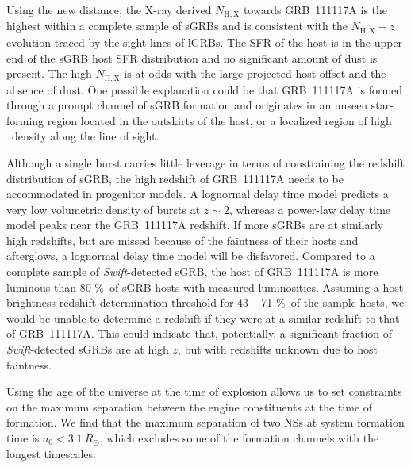 \documentclass[longauth]{aa}    %
\newcommand{\hi}{\ion{H}{i}}
\begin{document}
Using the new distance, the X-ray derived $N_\mathrm{H,X}$ towards GRB~111117A
is the highest within a complete sample of sGRBs and is consistent with the
$N_\mathrm{H,X}-z$ evolution traced by the sight lines of lGRBs. The SFR of the
host is in the upper end of the sGRB host SFR distribution and no significant
amount of dust is present. The high $N_\mathrm{H,X}$ is at odds with the large
projected host offset and the absence of dust. One possible explanation could be
that GRB~111117A is formed through a prompt channel of sGRB formation and
originates in an unseen star-forming region located in the outskirts of the
host, or a localized region of high \hi~density along the line of sight.

Although a single burst carries little leverage in terms of constraining the
redshift distribution of sGRB, the high redshift of GRB~111117A needs to be
accommodated in progenitor models. A lognormal delay time model predicts a very
low volumetric density of bursts at $z \sim 2$, whereas a power-law delay time
model peaks near the GRB~111117A redshift. If more sGRBs are at similarly high
redshifts, but are missed because of the faintness of their hosts and afterglows, a
lognormal delay time model will be disfavored. Compared to a complete sample of
\textit{Swift}-detected sGRB, the host of GRB~111117A is more luminous than 80
\%\ of sGRB hosts with measured luminosities. Assuming a host brightness
redshift determination threshold for  43 -- 71 \%\ of the sample
hosts, we would be unable to determine a redshift if  they were  at a similar
redshift to that of  GRB~111117A. This could indicate that, potentially, a significant
fraction of \textit{Swift}-detected sGRBs are at high $z$, but with redshifts
unknown due to host faintness.

Using the age of the universe at the time of explosion allows us to set
constraints on the maximum separation between the engine constituents at the
time of formation. We find that the maximum separation of two NSs at system
formation time is $a_0 < 3.1~R_\odot$, which excludes some of the formation
channels with the longest timescales.
\end{document}
